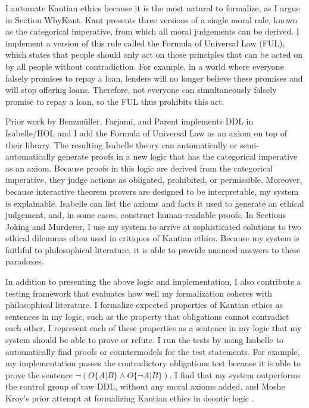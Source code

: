 \begin{isabellebody}
\begin{isamarkuptext}
I automate Kantian ethics because it is the most natural to formalize, as I argue in Section WhyKant. 
Kant presents three versions of a single moral rule, known as the categorical imperative, from which 
all moral judgements can be derived. I implement a version of this rule called the Formula of Universal 
Law (FUL), which states that people should only act on those principles that can be acted on by all 
people without contradiction. For example, in a world where everyone falsely promises to repay a loan, 
lenders will no longer believe these promises and will stop offering loans. Therefore, not everyone 
can simultaneously falsely promise to repay a loan, so the FUL thus prohibits this act.

Prior work by Benzmüller, Farjami, and Parent \citep{logikey, BFP} implements DDL in Isabelle/HOL and 
I add the Formula of Universal Law as an axiom on top of their library. The resulting Isabelle theory 
can automatically or semi-automatically generate proofs in a new logic that has the categorical 
imperative as an axiom. Because proofs in this logic are derived from the categorical imperative, 
they judge actions as obligated, prohibited, or permissible. Moreover, because interactive 
theorem provers are designed to be interpretable, my system is explainable. Isabelle can list 
the axioms and facts it used to generate an ethical judgement, and, in some cases, construct 
human-readable proofs. In Sections Joking and Murderer, I use my system to arrive at 
sophisticated solutions to two ethical dilemmas often used in critiques of Kantian ethics. Because 
my system is faithful to philosophical literature, it is able to provide nuanced answers to these paradoxes. 

In addition to presenting the above logic and implementation, I also contribute a testing framework 
that evaluates how well my formalization coheres with philosophical literature. I formalize expected 
properties of Kantian ethics as sentences in my logic, such as the property that obligations cannot 
contradict each other. I represent each of these properties as a sentence in my logic that my system 
should be able to prove or refute. I run the tests by using Isabelle to automatically find proofs or 
countermodels for the test statements. For example, my implementation passes the contradictory 
obligations test because it is able to prove the sentence $\neg (O\{A|B\} \wedge O\{\neg A | B\})$. 
I find that my system outperforms the control group of raw DDL, without any moral axioms added, and 
Moshe Kroy's prior attempt at formalizing Kantian ethics in deontic logic \citep{kroy}.


\end{isamarkuptext}
\end{isabellebody}
